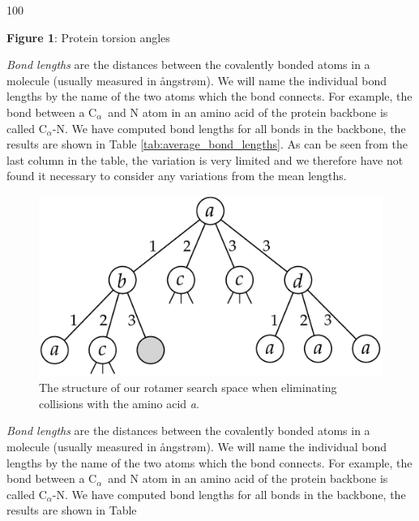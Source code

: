 \documentclass[a0,portrait]{a0poster}
\newcommand{\Ca}{C$_{\alpha}${}}
\begin{document}
\begin{GridBlock}{0}{40}{100}
 \begin{center}
\textbf{Figure 1}: Protein torsion angles
 \end{center}
\end{GridBlock}

\begin{GridBlock}{0}{55}{48}
\textit{Bond lengths} are the distances between the covalently bonded atoms
in a molecule (usually measured in ångstrøm). We will name the
individual bond lengths by the name of the two atoms which the bond
connects. For example, the bond between a \Ca\ and N atom in an amino acid of
the protein backbone is called \Ca -N. We have computed bond lengths
for all bonds in the backbone, the results are shown in Table
\ref{tab:average_bond_lengths}. As can be seen from the last column in
the table, the variation is very limited and we therefore have not
found it necessary to consider any variations from the mean
lengths.
\end{GridBlock}

\begin{GridBlock}{51}{55}{48}
\begin{figure}
    \centering
    \includegraphics[width=.45\textwidth]{../rapport/figures/rotamersearch}
    \caption{The structure of our rotamer search space when
      eliminating collisions with the amino acid \textit{a}.}
    \label{fig:rotamer-search-tree}
\end{figure}
\textit{Bond lengths} are the distances between the covalently bonded atoms
in a molecule (usually measured in ångstrøm). We will name the
individual bond lengths by the name of the two atoms which the bond
connects. For example, the bond between a \Ca\ and N atom in an amino acid of
the protein backbone is called \Ca -N. We have computed bond lengths
for all bonds in the backbone, the results are shown in Table
\end{GridBlock}
\end{document}
